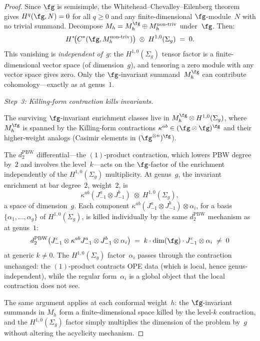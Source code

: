 \begin{proof}
Since $\fg$ is semisimple, the
Whitehead--Chevalley--Eilenberg theorem gives
$H^q(\fg, N) = 0$ for all $q \geq 0$ and any
finite-dimensional $\fg$-module~$N$ with no trivial
summand.  Decompose $M_h = M_h^{\fg} \oplus
M_h^{\mathrm{non\text{-}triv}}$ under~$\fg$.  Then:
\[
H^*\!\bigl(C^*(\fg, M_h^{\mathrm{non\text{-}triv}})\bigr)
\;\otimes\; H^{1,0}(\Sigma_g) \;=\; 0.
\]
This vanishing is \emph{independent of~$g$}: the
$H^{1,0}(\Sigma_g)$ tensor factor is a
finite-dimensional vector space (of dimension~$g$),
and tensoring a zero module with any vector space
gives zero.  Only the $\fg$-invariant
summand~$M_h^{\fg}$ can contribute cohomology---exactly
as at genus~$1$.

\medskip
\emph{Step~3: Killing-form contraction kills
invariants.}

The surviving $\fg$-invariant enrichment classes live in
$M_h^{\fg} \otimes H^{1,0}(\Sigma_g)$, where $M_h^{\fg}$
is spanned by the Killing-form contractions
$\kappa^{ab} \in (\fg \otimes \fg)^{\fg}$ and their
higher-weight analogs (Casimir elements in
$(\fg^{\otimes n})^{\fg}$).

The $d_2^{\mathrm{PBW}}$ differential---the $(1)$-product
contraction, which lowers PBW degree by~$2$ and
involves the level~$k$---acts on the $\fg$-factor of
the enrichment independently of the
$H^{1,0}(\Sigma_g)$ multiplicity.  At genus~$g$, the
invariant enrichment at bar degree~$2$, weight~$2$, is
\[
\kappa^{ab}(J^a_{-1} \otimes J^b_{-1})
\;\otimes\; H^{1,0}(\Sigma_g),
\]
a space of dimension~$g$.  Each component
$\kappa^{ab}(J^a_{-1} \otimes J^b_{-1}) \otimes \alpha_i$,
for a basis $\{\alpha_1, \ldots, \alpha_g\}$ of
$H^{1,0}(\Sigma_g)$, is killed individually by the same
$d_2^{\mathrm{PBW}}$ mechanism as at genus~$1$:
\[
d_2^{\mathrm{PBW}}\bigl(
J^c_{-1} \otimes \kappa^{ab} J^a_{-1}
\otimes J^b_{-1} \otimes \alpha_i\bigr)
\;=\;
k \cdot \dim(\fg) \cdot J^c_{-1} \otimes \alpha_i
\;\neq\; 0
\]
at generic $k \neq 0$.  The $H^{1,0}(\Sigma_g)$
factor~$\alpha_i$ passes through the contraction
unchanged: the $(1)$-product contracts OPE data (which
is local, hence genus-independent), while the
regular form~$\alpha_i$ is a global object that the
local contraction does not see.

The same argument applies at each conformal weight~$h$:
the $\fg$-invariant summands in $M_h$ form a
finite-dimensional space killed by the level-$k$
contraction, and the $H^{1,0}(\Sigma_g)$ factor
simply multiplies the dimension of the problem by~$g$
without altering the acyclicity mechanism.


\end{proof}
